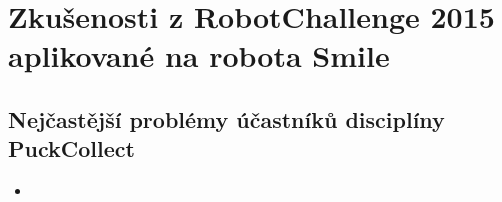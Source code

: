 \chapter{Zkušenosti z RobotChallenge 2015 aplikované na robota Smile}

\section{Nejčastější problémy účastníků disciplíny PuckCollect}

\begin{itemize}

\item 

\end{itemize}